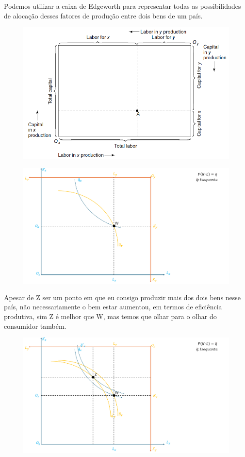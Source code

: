 \documentclass[a4paper,12pt]{article}[abntex2]
\begin{document}
Podemos utilizar a caixa de Edgeworth para representar todas as possibilidades de alocação desses fatores de produção entre dois bens de um país.

\begin{figure}[H]
    \centering
    \includegraphics[width=0.70\linewidth]{Imagens/a3i1.png}
\end{figure}

\begin{figure}[H]
    \centering
    \includegraphics[width=0.7\linewidth]{Imagens/a5i1.png}
\end{figure}

Apesar de Z ser um ponto em que eu consigo produzir mais dos dois bens nesse país, não necessariamente o bem estar aumentou, em termos de eficiência produtiva, sim Z é melhor que W, mas temos que olhar para o olhar do consumidor também.

\begin{figure}[H]
    \centering
    \includegraphics[width=0.7\linewidth]{Imagens/a5i2.png}
\end{figure}
\end{document}
